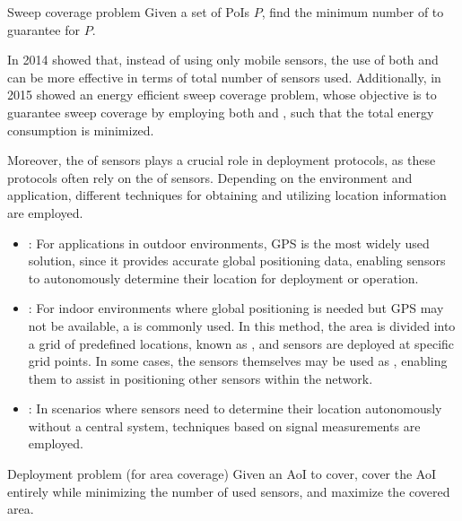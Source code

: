 \documentclass[a4paper, 12pt]{report}
\begin{document}
    \begin{frameddefn}{Sweep coverage problem}
        Given a set of PoIs $P$, find the minimum number of  to guarantee  for $P$.
    \end{frameddefn}

    In 2014 \textcite{gorain14} showed that, instead of using only mobile sensors, the use of both  and  can be more effective in terms of total number of sensors used. Additionally, in 2015 \textcite{gorain15} showed an energy efficient sweep coverage problem, whose objective is to guarantee sweep coverage by employing both  and , such that the total energy consumption is minimized.

    Moreover, the  of sensors plays a crucial role in deployment protocols, as these protocols often rely on the  of sensors. Depending on the environment and application, different techniques for obtaining and utilizing location information are employed.

    \begin{itemize}
        \item {}: For applications in outdoor environments, GPS is the most widely used solution, since it provides accurate global positioning data, enabling sensors to autonomously determine their location for deployment or operation.
        \item {}: For indoor environments where global positioning is needed but GPS may not be available, a  is commonly used. In this method, the area is divided into a grid of predefined locations, known as , and sensors are deployed at specific grid points. In some cases, the sensors themselves may be used as , enabling them to assist in positioning other sensors within the network.
        \item {}: In scenarios where sensors need to determine their location autonomously without a central system, techniques based on signal measurements are employed.
    \end{itemize}

    \begin{frameddefn}{Deployment problem (for area coverage)}
        Given an AoI to cover, cover the AoI entirely while minimizing the number of used sensors, and maximize the covered area.
    \end{frameddefn}
\end{document}
